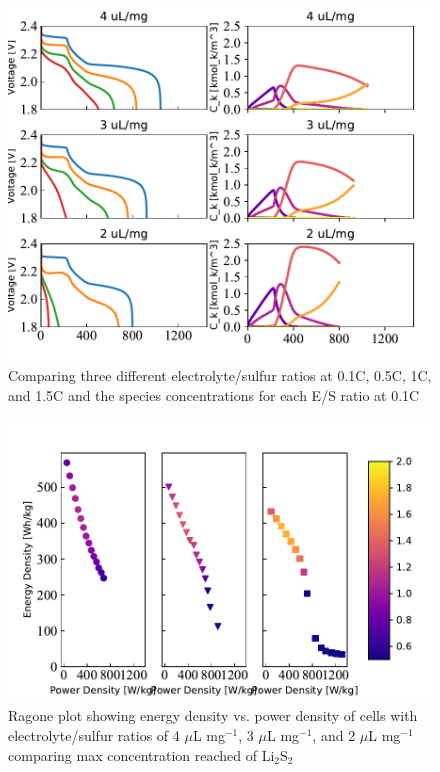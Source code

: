 \documentclass{elsarticle}
\begin{document}
\begin{figure}
    \centering
    \includegraphics[width=\textwidth]{Figures/E_S_ratio_comp.pdf}
    \caption{Comparing three different electrolyte/sulfur ratios at 0.1C, 0.5C, 1C, and 1.5C and the species concentrations for each E/S ratio at 0.1C}
    \label{fig:E_S_ratio_comp}
\end{figure}


\begin{figure}
    \centering
    \includegraphics[width=\textwidth]{Figures/Ragone_ES_ratio_Li2S2.pdf}
    \caption{Ragone plot showing energy density vs. power density of cells with electrolyte/sulfur ratios of 4 $\mu$L mg$^{-1}$, 3 $\mu$L mg$^{-1}$, and 2 $\mu$L mg$^{-1}$ comparing max concentration reached of Li$_2$S$_2$}
    \label{fig:ragoneLi2S2}
\end{figure}
\end{document}
